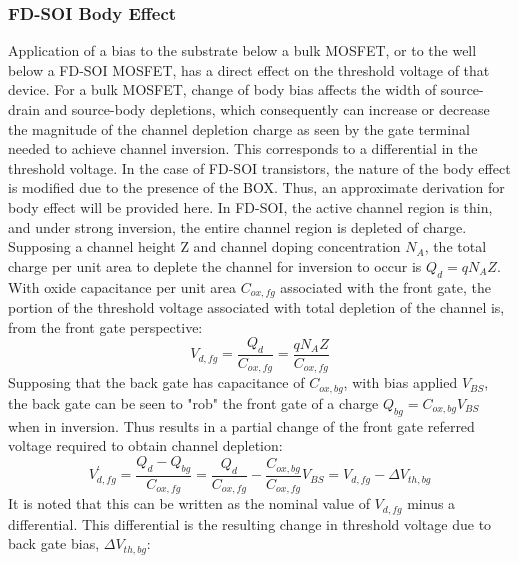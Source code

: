 	\subsubsection{FD-SOI Body Effect}
	Application of a bias to the substrate below a bulk MOSFET, or to the well below a FD-SOI MOSFET, has a direct effect on the threshold voltage of that device. For a bulk MOSFET, change of body bias affects the width of source-drain and source-body depletions, which consequently can increase or decrease the magnitude of the channel depletion charge as seen by the gate terminal needed to achieve channel inversion. This corresponds to a differential in the threshold voltage. %
	In the case of FD-SOI transistors, the nature of the body effect is modified due to the presence of the BOX. Thus, an approximate derivation for body effect will be provided here. In FD-SOI, the active channel region is thin, and under strong inversion, the entire channel region is depleted of charge. Supposing a channel height Z and channel doping concentration $N_A$, the total charge per unit area to deplete the channel for inversion to occur is $Q_{d} = qN_AZ$. With oxide capacitance per unit area $C_{ox,fg}$ associated with the front gate, the portion of the threshold voltage associated with total depletion of the channel is, from the front gate perspective:
	\begin{equation}
		V_{d,fg} = \frac{Q_d}{C_{ox,fg}} = \frac{qN_AZ}{C_{ox,fg}} 
	\end{equation}
	Supposing that the back gate has capacitance of $C_{ox,bg}$, with bias applied $V_{BS}$, the back gate can be seen to "rob" the front gate of a charge $Q_{bg} = C_{ox,bg}V_{BS}$ when in inversion. Thus results in a partial change of the front gate referred voltage required to obtain channel depletion:
	\begin{equation}
		V_{d,fg}^{'} = \frac{Q_d-Q_{bg}}{C_{ox,fg}} = \frac{Q_d}{C_{ox,fg}} - \frac{C_{ox,bg}}{C_{ox,fg}}V_{BS} = V_{d,fg}-\Delta V_{th,bg}
	\end{equation}
	It is noted that this can be written as the nominal value of $V_{d,fg}$ minus a differential. This differential is the resulting change in threshold voltage due to back gate bias, $\Delta V_{th,bg}$:
